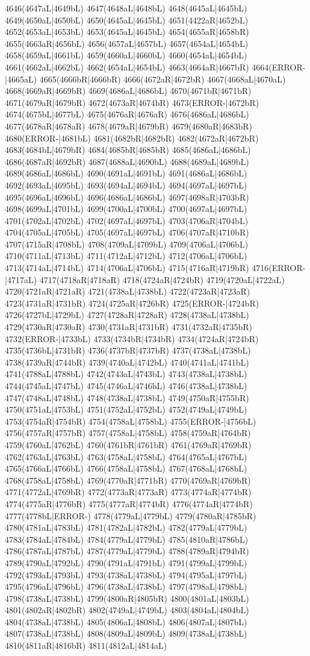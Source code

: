 4646(4647aL|4649bL) 4647(4648aL|4648bL) 4648(4645aL|4645bL) 4649(4650aL|4650bL) 4650(4645aL|4645bL) 4651(4422aR|4652bL) 4652(4653aL|4653bL) 4653(4645aL|4645bL) 4654(4655aR|4658bR) 4655(4663aR|4656bL) 4656(4657aL|4657bL) 4657(4654aL|4654bL) 4658(4659aL|4661bL) 4659(4660aL|4660bL) 4660(4654aL|4654bL) 4661(4662aL|4662bL) 4662(4654aL|4654bL) 4663(4664aR|4667bR) 4664(ERROR-|4665aL) 4665(4666bR|4666bR) 4666(4672aR|4672bR) 4667(4668aL|4670aL) 4668(4669aR|4669bR) 4669(4686aL|4686bL) 4670(4671bR|4671bR) 4671(4679aR|4679bR) 4672(4673aR|4674bR) 4673(ERROR-|4672bR) 4674(4675bL|4677bL) 4675(4676aR|4676aR) 4676(4686aL|4686bL) 4677(4678aR|4678aR) 4678(4679aR|4679bR) 4679(4680aR|4683bR) 4680(ERROR-|4681bL) 4681(4682bR|4682bR) 4682(4672aR|4672bR) 4683(4684bL|4679bR) 4684(4685bR|4685bR) 4685(4686aL|4686bL) 4686(4687aR|4692bR) 4687(4688aL|4690bL) 4688(4689aL|4689bL) 4689(4686aL|4686bL) 4690(4691aL|4691bL) 4691(4686aL|4686bL) 4692(4693aL|4695bL) 4693(4694aL|4694bL) 4694(4697aL|4697bL) 4695(4696aL|4696bL) 4696(4686aL|4686bL) 4697(4698aR|4703bR) 4698(4699aL|4701bL) 4699(4700aL|4700bL) 4700(4697aL|4697bL) 4701(4702aL|4702bL) 4702(4697aL|4697bL) 4703(4706aR|4704bL) 4704(4705aL|4705bL) 4705(4697aL|4697bL) 4706(4707aR|4710bR) 4707(4715aR|4708bL) 4708(4709aL|4709bL) 4709(4706aL|4706bL) 4710(4711aL|4713bL) 4711(4712aL|4712bL) 4712(4706aL|4706bL) 4713(4714aL|4714bL) 4714(4706aL|4706bL) 4715(4716aR|4719bR) 4716(ERROR-|4717aL) 4717(4718aR|4718aR) 4718(4724aR|4724bR) 4719(4720aL|4722aL) 4720(4721aR|4721aR) 4721(4738aL|4738bL) 4722(4723aR|4723aR) 4723(4731aR|4731bR) 4724(4725aR|4726bR) 4725(ERROR-|4724bR) 4726(4727bL|4729bL) 4727(4728aR|4728aR) 4728(4738aL|4738bL) 4729(4730aR|4730aR) 4730(4731aR|4731bR) 4731(4732aR|4735bR) 4732(ERROR-|4733bL) 4733(4734bR|4734bR) 4734(4724aR|4724bR) 4735(4736bL|4731bR) 4736(4737bR|4737bR) 4737(4738aL|4738bL) 4738(4739aR|4744bR) 4739(4740aL|4742bL) 4740(4741aL|4741bL) 4741(4788aL|4788bL) 4742(4743aL|4743bL) 4743(4738aL|4738bL) 4744(4745aL|4747bL) 4745(4746aL|4746bL) 4746(4738aL|4738bL) 4747(4748aL|4748bL) 4748(4738aL|4738bL) 4749(4750aR|4755bR) 4750(4751aL|4753bL) 4751(4752aL|4752bL) 4752(4749aL|4749bL) 4753(4754aR|4754bR) 4754(4758aL|4758bL) 4755(ERROR-|4756bL) 4756(4757aR|4757bR) 4757(4758aL|4758bL) 4758(4759aR|4764bR) 4759(4760aL|4762bL) 4760(4761bR|4761bR) 4761(4769aR|4769bR) 4762(4763aL|4763bL) 4763(4758aL|4758bL) 4764(4765aL|4767bL) 4765(4766aL|4766bL) 4766(4758aL|4758bL) 4767(4768aL|4768bL) 4768(4758aL|4758bL) 4769(4770aR|4771bR) 4770(4769aR|4769bR) 4771(4772aL|4769bR) 4772(4773aR|4773aR) 4773(4774aR|4774bR) 4774(4775aR|4776bR) 4775(4777aR|4774bR) 4776(4774aR|4774bR) 4777(4778bL|ERROR-) 4778(4779aL|4779bL) 4779(4780aR|4785bR) 4780(4781aL|4783bL) 4781(4782aL|4782bL) 4782(4779aL|4779bL) 4783(4784aL|4784bL) 4784(4779aL|4779bL) 4785(4810aR|4786bL) 4786(4787aL|4787bL) 4787(4779aL|4779bL) 4788(4789aR|4794bR) 4789(4790aL|4792bL) 4790(4791aL|4791bL) 4791(4799aL|4799bL) 4792(4793aL|4793bL) 4793(4738aL|4738bL) 4794(4795aL|4797bL) 4795(4796aL|4796bL) 4796(4738aL|4738bL) 4797(4798aL|4798bL) 4798(4738aL|4738bL) 4799(4800aR|4805bR) 4800(4801aL|4803bL) 4801(4802aR|4802bR) 4802(4749aL|4749bL) 4803(4804aL|4804bL) 4804(4738aL|4738bL) 4805(4806aL|4808bL) 4806(4807aL|4807bL) 4807(4738aL|4738bL) 4808(4809aL|4809bL) 4809(4738aL|4738bL) 4810(4811aR|4816bR) 4811(4812aL|4814aL) 